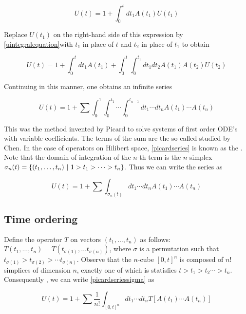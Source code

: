 \begin{equation}
\label{uintegralequation}
U(t) = 1 + \int_0^t dt_1 A(t_1)U(t_1)
\end{equation}

Replace $U(t_1)$ on the right-hand side of this expression by \eqref{uintegralequation}with $t_1$ in place of $t$ and $t_2$ in place of $t_1$ to obtain

\begin{equation}
U(t) = 1 + \int_0^t dt_1 A(t_1)   
+ \int_0^t  \int_0^{t_1}   dt_1dt_2 A(t_1) A(t_2)U(t_2)
\end{equation}

Continuing in this manner, one obtains an infinite series

\begin{equation}
\label{picardseries}
U(t) = 1 + \sum \int_0^1 \int_0^{t_1}\cdots \int_0^{t_{n-1}} dt_1 \cdots dt_n A(t_1) \cdots A(t_n)
\end{equation}

This was the method invented by Picard to solve systems of first order ODE's with variable coefficients.  The terms of the sum are the so-called   studied by Chen.  In the case of operators on Hilibert space, \eqref{picardseries} is known as the .  Note that the domain of integration of the $n$-th term is the $n$-simplex $\sigma_{n}(t) = \{(t_1, \ldots, t_n)\ |\  1 > t_1 > \cdots > t_n \}$. Thus we can write the series as

\begin{equation}
\label{picardseriessigma}
U(t) = 1 + \sum \int_{\sigma_n(t)} dt_1 \cdots dt_n A(t_1) \cdots A(t_n)
\end{equation}


\subsection{Time ordering}

Define the  operator $T$ on vectors $(t_1, \ldots, t_n)$ as follows: 
$T(t_1, \ldots, t_n) = T(t_{\sigma(1)}, \ldots t_{\sigma(n)})$, where $\sigma$ is a permutation such that $t_{\sigma(1)} > t_{\sigma(2)} > \cdots t_{\sigma(n)}$.  Observe that the $n$-cube $[0,t]^n$ is composed of $n!$ simplices of dimension $n$, exactly one of which is statisfies $t > t_1 > t_2 \cdots > t_n$.  Consequently , we can write \eqref{picardseriessigma} as

\begin{equation}
\label{propagator_series}
U(t) = 1 + \sum \frac{1}{n!}\int_{[0,t]^n} dt_1 \cdots dt_n T[A(t_1) \cdots A(t_n)]
\end{equation}

